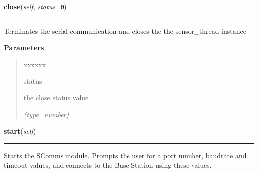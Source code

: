 \hspace{.8\funcindent}\begin{boxedminipage}{\funcwidth}

    \raggedright \textbf{close}(\textit{self}, \textit{status}={\tt 0})

    \vspace{-1.5ex}

    \rule{\textwidth}{0.5\fboxrule}
\setlength{\parskip}{2ex}
    Terminates the serial communication and closes the the sensor\_thread 
    instance

\setlength{\parskip}{1ex}
      \textbf{Parameters}
      \vspace{-1ex}

      \begin{quote}
        \begin{Ventry}{xxxxxx}

          \item[status]

          the close status value

            {\it (type=number)}

        \end{Ventry}

      \end{quote}

    \end{boxedminipage}

    \label{Serial_conn:Serial_conn:start}

    \vspace{0.5ex}

\hspace{.8\funcindent}\begin{boxedminipage}{\funcwidth}

    \raggedright \textbf{start}(\textit{self})

    \vspace{-1.5ex}

    \rule{\textwidth}{0.5\fboxrule}
\setlength{\parskip}{2ex}
    Starts the SComms module. Prompts the user for a port number, baudrate 
    and timeout values, and connects to the Base Station using these 
    values.

\setlength{\parskip}{1ex}
    \end{boxedminipage}

    \label{Serial_conn:Serial_conn:base_st_connect}

